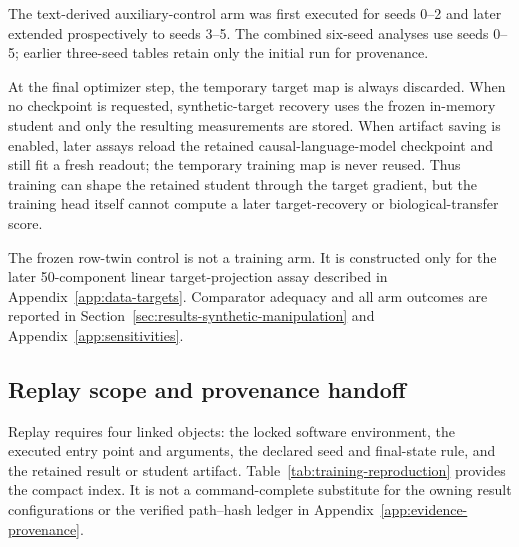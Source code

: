 The text-derived auxiliary-control arm was first executed for seeds 0--2 and later extended prospectively to seeds 3--5.
The combined six-seed analyses use seeds 0--5; earlier three-seed tables retain only the initial run for provenance.

At the final optimizer step, the temporary target map is always discarded.
When no checkpoint is requested, synthetic-target recovery uses the frozen in-memory student and only the resulting measurements are stored.
When artifact saving is enabled, later assays reload the retained causal-language-model checkpoint and still fit a fresh readout; the temporary training map is never reused.
Thus training can shape the retained student through the target gradient, but the training head itself cannot compute a later target-recovery or biological-transfer score. 

The frozen row-twin control is not a training arm.
It is constructed only for the later 50-component linear target-projection assay described in Appendix~\ref{app:data-targets}.
Comparator adequacy and all arm outcomes are reported in Section~\ref{sec:results-synthetic-manipulation} and Appendix~\ref{app:sensitivities}. 

\subsection{Replay scope and provenance handoff}

Replay requires four linked objects: the locked software environment, the executed entry point and arguments, the declared seed and final-state rule, and the retained result or student artifact.
Table~\ref{tab:training-reproduction} provides the compact index.
It is not a command-complete substitute for the owning result configurations or the verified path--hash ledger in Appendix~\ref{app:evidence-provenance}.

